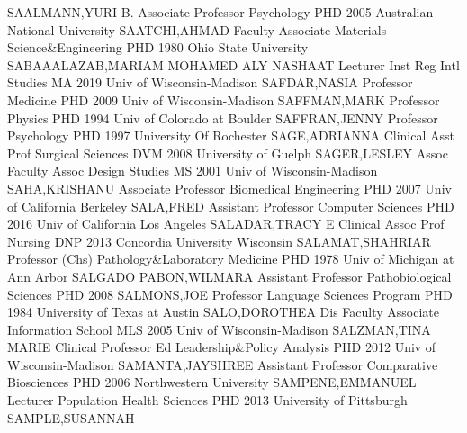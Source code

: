 \documentclass[
]{article}
\begin{document}
SAALMANN,YURI B. \textbar{}  \textbar Associate Professor
\textbar Psychology \textbar PHD 2005 Australian National University
\textbar SAATCHI,AHMAD \textbar{}  \textbar Faculty
Associate \textbar Materials Science\&Engineering \textbar PHD 1980 Ohio
State University \textbar SABAAALAZAB,MARIAM MOHAMED ALY NASHAAT
\textbar{}  \textbar Lecturer \textbar Inst Reg Intl Studies
\textbar MA 2019 Univ of Wisconsin-Madison \textbar SAFDAR,NASIA
\textbar{}  \textbar Professor \textbar Medicine
\textbar PHD 2009 Univ of Wisconsin-Madison \textbar SAFFMAN,MARK
\textbar{}  \textbar Professor \textbar Physics \textbar PHD
1994 Univ of Colorado at Boulder \textbar SAFFRAN,JENNY \textbar{}
 \textbar Professor \textbar Psychology \textbar PHD 1997
University Of Rochester \textbar SAGE,ADRIANNA \textbar{} 
\textbar Clinical Asst Prof \textbar Surgical Sciences \textbar DVM 2008
University of Guelph \textbar SAGER,LESLEY \textbar{} 
\textbar Assoc Faculty Assoc \textbar Design Studies \textbar MS 2001
Univ of Wisconsin-Madison \textbar SAHA,KRISHANU \textbar{} 
\textbar Associate Professor \textbar Biomedical Engineering
\textbar PHD 2007 Univ of California Berkeley \textbar SALA,FRED
\textbar{}  \textbar Assistant Professor \textbar Computer
Sciences \textbar PHD 2016 Univ of California Los Angeles
\textbar SALADAR,TRACY E \textbar{}  \textbar Clinical Assoc
Prof \textbar Nursing \textbar DNP 2013 Concordia University Wisconsin
\textbar SALAMAT,SHAHRIAR \textbar{}  \textbar Professor
(Chs) \textbar Pathology\&Laboratory Medicine \textbar PHD 1978 Univ of
Michigan at Ann Arbor \textbar SALGADO PABON,WILMARA \textbar{}
 \textbar Assistant Professor \textbar Pathobiological
Sciences \textbar PHD 2008 \textbar SALMONS,JOE \textbar{} 
\textbar Professor \textbar Language Sciences Program \textbar PHD 1984
University of Texas at Austin \textbar SALO,DOROTHEA \textbar{}
 \textbar Dis Faculty Associate \textbar Information School
\textbar MLS 2005 Univ of Wisconsin-Madison \textbar SALZMAN,TINA MARIE
\textbar{}  \textbar Clinical Professor \textbar Ed
Leadership\&Policy Analysis \textbar PHD 2012 Univ of Wisconsin-Madison
\textbar SAMANTA,JAYSHREE \textbar{}  \textbar Assistant
Professor \textbar Comparative Biosciences \textbar PHD 2006
Northwestern University \textbar SAMPENE,EMMANUEL \textbar{}
 \textbar Lecturer \textbar Population Health Sciences
\textbar PHD 2013 University of Pittsburgh \textbar SAMPLE,SUSANNAH
\end{document}
